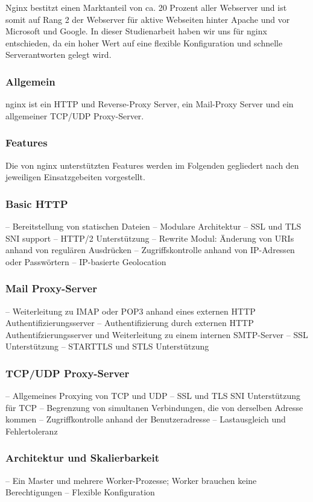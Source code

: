 Nginx bestitzt einen Marktanteil von ca. 20 Prozent aller Webserver und ist somit auf Rang 2 der Webserver für aktive Webseiten hinter Apache und vor Microsoft und Google\cite{.k}. In dieser Studienarbeit haben wir uns für nginx entschieden, da ein hoher Wert auf eine flexible Konfiguration und schnelle Serverantworten gelegt wird.

\subsubsection{Allgemein}
\label{sec:NginxAllgemein}

nginx ist ein HTTP und Reverse-Proxy Server, ein Mail-Proxy Server und ein allgemeiner TCP/UDP Proxy-Server.


\subsubsection{Features}
\label{sec:NginxFeatures}
Die von nginx unterstützten Features werden im Folgenden gegliedert nach den jeweiligen Einsatzgebeiten vorgestellt.\cite{.14.03.2017}

\subsubsection{Basic HTTP}
\label{sec:NginxBasicHTTP}
–	Bereitstellung von statischen Dateien
–	Modulare Architektur
–	SSL und TLS SNI support
–	HTTP/2 Unterstützung
–	Rewrite Modul: Änderung von URIs anhand von regulären Ausdrücken
–	Zugriffskontrolle anhand von IP-Adressen oder Passwörtern
–	IP-basierte Geolocation

\subsubsection{Mail Proxy-Server}
\label{sec:NginxMail Proxy-Server}
–	Weiterleitung zu IMAP oder POP3 anhand eines externen HTTP Authentifizierungsserver
–	Authentifizierung durch externen HTTP Authentifzierungsserver und Weiterleitung zu einem internen SMTP-Server
–	SSL Unterstützung
–	STARTTLS und STLS Unterstützung

\subsubsection{TCP/UDP Proxy-Server}
\label{sec:NginxTCP/UDP Proxy-Server}
–	Allgemeines Proxying von TCP und UDP
–	SSL und TLS SNI Unterstützung für TCP
–	Begrenzung von simultanen Verbindungen, die von derselben Adresse kommen
–	Zugriffkontrolle anhand der Benutzeradresse
–	Lastausgleich und Fehlertoleranz

\subsubsection{Architektur und Skalierbarkeit}
\label{sec:NginxArchitektur und Skalierbarkeit}
–	Ein Master und mehrere Worker-Prozesse; Worker brauchen keine Berechtigungen
–	Flexible Konfiguration
